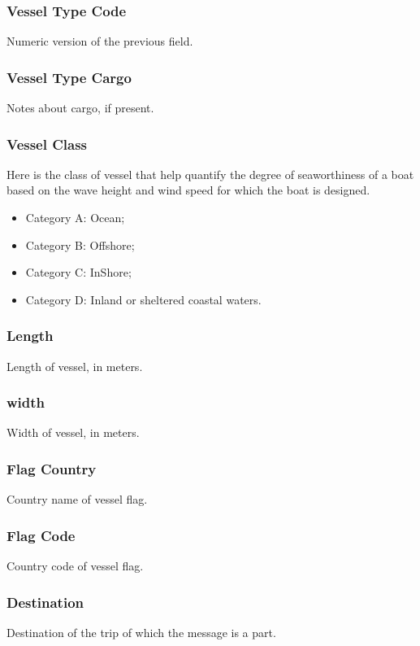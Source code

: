         \subsubsection{Vessel Type Code}
            Numeric version of the previous field.
        \subsubsection{Vessel Type Cargo}
            Notes about cargo, if present.
        \subsubsection{Vessel Class}
            Here is the class of vessel that help quantify the degree of seaworthiness of a boat based on the wave height and wind speed for which the boat is designed.\cite{vessel_classes}
            
            \begin{itemize}
            \item Category A: Ocean;
            \item Category B: Offshore;
            \item Category C: InShore;
            \item Category D: Inland or sheltered coastal waters.
            \end{itemize}

            
        \subsubsection{Length}
            Length of vessel, in meters.
        \subsubsection{width}
            Width of vessel, in meters.
        \subsubsection{Flag Country}
            Country name of vessel flag.
        \subsubsection{Flag Code}
            Country code of vessel flag.
        \subsubsection{Destination}
            Destination of the trip of which the message is a part.
